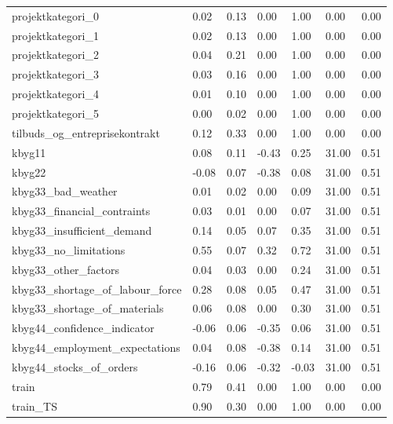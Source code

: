 \begin{landscape}
\begin{longtable}[h!]{lllllll}
projektkategori_0 & 0.02 & 0.13 & 0.00 & 1.00 & 0.00 & 0.00 \\
projektkategori_1 & 0.02 & 0.13 & 0.00 & 1.00 & 0.00 & 0.00 \\
projektkategori_2 & 0.04 & 0.21 & 0.00 & 1.00 & 0.00 & 0.00 \\
projektkategori_3 & 0.03 & 0.16 & 0.00 & 1.00 & 0.00 & 0.00 \\
projektkategori_4 & 0.01 & 0.10 & 0.00 & 1.00 & 0.00 & 0.00 \\
projektkategori_5 & 0.00 & 0.02 & 0.00 & 1.00 & 0.00 & 0.00 \\
tilbuds_og_entreprisekontrakt & 0.12 & 0.33 & 0.00 & 1.00 & 0.00 & 0.00 \\
kbyg11 & 0.08 & 0.11 & -0.43 & 0.25 & 31.00 & 0.51 \\
kbyg22 & -0.08 & 0.07 & -0.38 & 0.08 & 31.00 & 0.51 \\
kbyg33_bad_weather & 0.01 & 0.02 & 0.00 & 0.09 & 31.00 & 0.51 \\
kbyg33_financial_contraints & 0.03 & 0.01 & 0.00 & 0.07 & 31.00 & 0.51 \\
kbyg33_insufficient_demand & 0.14 & 0.05 & 0.07 & 0.35 & 31.00 & 0.51 \\
kbyg33_no_limitations & 0.55 & 0.07 & 0.32 & 0.72 & 31.00 & 0.51 \\
kbyg33_other_factors & 0.04 & 0.03 & 0.00 & 0.24 & 31.00 & 0.51 \\
kbyg33_shortage_of_labour_force & 0.28 & 0.08 & 0.05 & 0.47 & 31.00 & 0.51 \\
kbyg33_shortage_of_materials & 0.06 & 0.08 & 0.00 & 0.30 & 31.00 & 0.51 \\
kbyg44_confidence_indicator & -0.06 & 0.06 & -0.35 & 0.06 & 31.00 & 0.51 \\
kbyg44_employment_expectations & 0.04 & 0.08 & -0.38 & 0.14 & 31.00 & 0.51 \\
kbyg44_stocks_of_orders & -0.16 & 0.06 & -0.32 & -0.03 & 31.00 & 0.51 \\
train & 0.79 & 0.41 & 0.00 & 1.00 & 0.00 & 0.00 \\
train_TS & 0.90 & 0.30 & 0.00 & 1.00 & 0.00 & 0.00 \\
\end{longtable}\end{landscape}
